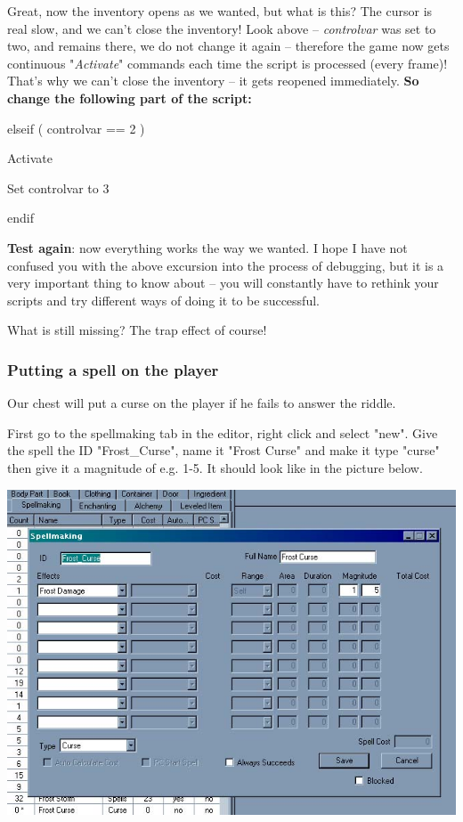 \documentclass[
]{article}
\begin{document}
Great, now the inventory opens as we wanted, but what is this? The
cursor is real slow, and we can't close the inventory! Look above --
\emph{controlvar} was set to two, and remains there, we do not change it
again -- therefore the game now gets continuous "\emph{Activate}"
commands each time the script is processed (every frame)! That's why we
can't close the inventory -- it gets reopened immediately. \textbf{So
change the following part of the script:}

elseif ( controlvar == 2 )

Activate

Set controlvar to 3

endif

\textbf{Test again}: now everything works the way we wanted. I hope I
have not confused you with the above excursion into the process of
debugging, but it is a very important thing to know about -- you will
constantly have to rethink your scripts and try different ways of doing
it to be successful.

What is still missing? The trap effect of course!

\hypertarget{putting-a-spell-on-the-player}{%
\subsubsection{Putting a spell on the
player}\label{putting-a-spell-on-the-player}}

Our chest will put a curse on the player if he fails to answer the
riddle.

First go to the spellmaking tab in the editor, right click and select
"new". Give the spell the ID "Frost\_Curse", name it "Frost Curse" and
make it type "curse" then give it a magnitude of e.g. 1-5. It should
look like in the picture below.

\includegraphics{media/image4.jpg}
\end{document}
